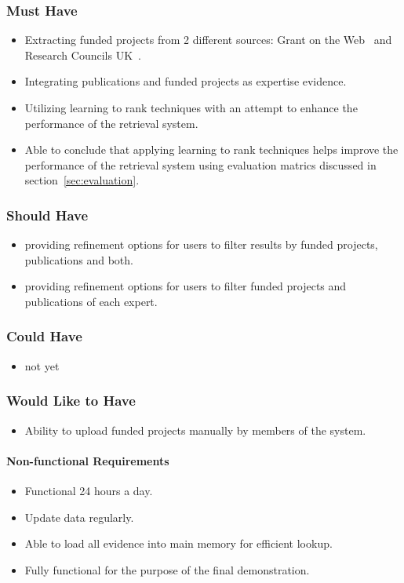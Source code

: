 \subsubsection{Must Have}
\begin{itemize}
 \item Extracting funded projects from 2 different sources: Grant on the Web~\cite{gow} and Research Councils UK~\cite{gtr}.
 \item Integrating publications and funded projects as expertise evidence.
 \item Utilizing learning to rank techniques with an attempt to enhance the performance of the retrieval system.
 \item Able to conclude that applying learning to rank techniques helps improve the performance of the retrieval system using evaluation matrics discussed
 in section~\ref{sec:evaluation}. 
\end{itemize}

\subsubsection{Should Have}
\begin{itemize}
 \item providing refinement options for users to filter results by funded projects, publications and both.
 \item providing refinement options for users to filter funded projects and publications of each expert.
\end{itemize}

\subsubsection{Could Have}
\begin{itemize}
 \item not yet
\end{itemize}

\subsubsection{Would Like to Have}
\begin{itemize}
 \item Ability to upload funded projects manually by members of the system.
\end{itemize}

\paragraph{Non-functional Requirements}
\begin{itemize}
 \item Functional 24 hours a day.
 \item Update data regularly.
 \item Able to load all evidence into main memory for efficient lookup.
 \item Fully functional for the purpose of the final demonstration.
\end{itemize}

